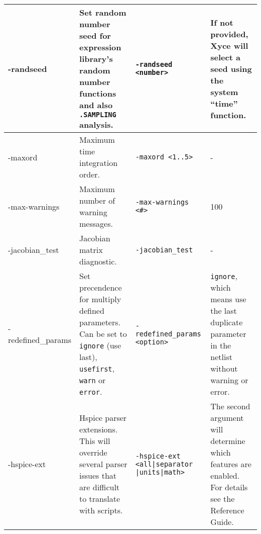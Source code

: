 \begin{longtable}[h] {>{\raggedright\small}m{1.1in}|>{\raggedright\small}m{2in}|>{\raggedright\small}m{1.5in}|>{\raggedright\let\\\tabularnewline\small}m{1in}}
-randseed &
Set random number seed for expression library's random number functions
 and also \texttt{.SAMPLING} analysis. &
\verb+-randseed <number>+ &
If not provided, Xyce will select a seed using the system ``time'' function.  \\ \hline

-maxord &
Maximum time integration order. &
\verb+-maxord <1..5>+ &
- \\ \hline

-max-warnings &
Maximum number of warning messages. &
\verb+-max-warnings <#>+ &
100 \\ \hline

-jacobian\_test &
Jacobian matrix diagnostic. &
\verb+-jacobian_test+ &
- \\ \hline

-redefined\_params & 
Set precendence for multiply defined parameters. Can be set to \texttt{ignore} (use last), \texttt{usefirst}, \texttt{warn} or \texttt{error}. &
\verb+-redefined_params+
\verb+<option>+ & \texttt{ignore}, which means use the last duplicate parameter in the netlist without warning or error.
  \\ \hline

-hspice-ext &
Hspice parser extensions.  This will override several parser issues that are difficult to translate with scripts. 

&
\verb+-hspice-ext+
\verb+<all|separator+
\verb+|units|math>+ & 
The second argument will determine which features are enabled.  
For details see the \Xyce{} Reference Guide\ReferenceGuide{}.
\\ \hline


\end{longtable}

